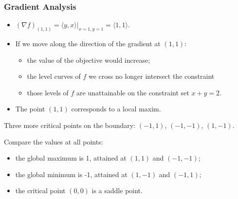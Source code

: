 \begin{frame}
    \frametitle{Gradient Analysis}

    \begin{itemize}
      \item \pause $(\nabla f)_{(1,1)} = \langle y, x \rangle|_{x=1,y=1} = \langle 1,1\rangle$.
      \item \pause If we move along the direction of the gradient at $(1,1)$:
      \begin{itemize}
        \item the value of the objective would increase;
        \item the level curves of $f$ we cross no longer intersect the constraint
        \item those levels of $f$ are unattainable on the constraint set $x+y=2$.
      \end{itemize}
      \item \pause The point $(1,1)$ corresponds to a local maxim.
    \end{itemize}

\pause
Three more critical points on the boundary: $(-1,1)$, $(-1,-1)$, $(1,-1)$.

\pause
Compare the values at all points:
\begin{itemize}
  \item the global maximum is 1, attained at $(1,1)$ and $(-1,-1)$;
  \item the global minimum is -1, attained at $(1,-1)$ and $(-1,1)$;
  \item the critical point $(0,0)$ is a saddle point.
\end{itemize}

\end{frame}